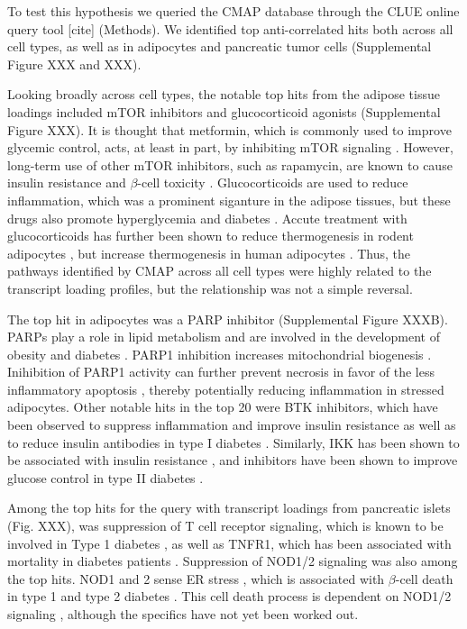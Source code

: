 \documentclass[
]{article}
\begin{document}
To test this hypothesis we queried the CMAP database through the CLUE
online query tool {[}cite{]} (Methods). We identified top
anti-correlated hits both across all cell types, as well as in
adipocytes and pancreatic tumor cells (Supplemental Figure XXX and XXX).

Looking broadly across cell types, the notable top hits from the adipose
tissue loadings included mTOR inhibitors and glucocorticoid agonists
(Supplemental Figure XXX). It is thought that metformin, which is
commonly used to improve glycemic control, acts, at least in part, by
inhibiting mTOR signaling \cite{pmid30290005, 
pmid30034573}. However, long-term use of other mTOR inhibitors, such as
rapamycin, are known to cause insulin resistance and \(\beta\)-cell
toxicity \cite{pmid30034573, pmid23881200, pmid21266327}.
Glucocorticoids are used to reduce inflammation, which was a prominent
siganture in the adipose tissues, but these drugs also promote
hyperglycemia and diabetes \cite{pmid24582093, pmid35585199}. Accute
treatment with glucocorticoids has further been shown to reduce
thermogenesis in rodent adipocytes \cite{pmid30310815, pmid11254472, 
pmid23197361}, but increase thermogenesis in human adipocytes
\cite{pmid27411014, pmid25385872}. Thus, the pathways identified by CMAP
across all cell types were highly related to the transcript loading
profiles, but the relationship was not a simple reversal.

The top hit in adipocytes was a PARP inhibitor (Supplemental Figure
XXXB). PARPs play a role in lipid metabolism and are involved in the
development of obesity and diabetes \cite{pmid34450194}. PARP1
inhibition increases mitochondrial biogenesis \cite{pmid21459330}.
Inihibition of PARP1 activity can further prevent necrosis in favor of
the less inflammatory apoptosis \cite{pmid12114611}, thereby potentially
reducing inflammation in stressed adipocytes. Other notable hits in the
top 20 were BTK inhibitors, which have been observed to suppress
inflammation and improve insulin resistance \cite{pmid33648925} as well
as to reduce insulin antibodies in type I diabetes \cite{pmid28753229}.
Similarly, IKK has been shown to be associated with insulin resistance
\cite{pmid15685170}, and inhibitors have been shown to improve glucose
control in type II diabetes \cite{pmid28683283}.

Among the top hits for the query with transcript loadings from
pancreatic islets (Fig. XXX), was suppression of T cell receptor
signaling, which is known to be involved in Type 1 diabetes
\cite{pmid33603744}, as well as TNFR1, which has been associated with
mortality in diabetes patients \cite{pmid32281000}. Suppression of
NOD1/2 signaling was also among the top hits. NOD1 and 2 sense ER stress
\cite{pmid27007849, pmid28823510}, which is associated with
\(\beta\)-cell death in type 1 and type 2 diabetes \cite{pmid24520198}.
This cell death process is dependent on NOD1/2 signaling
\cite{pmid27007849}, although the specifics have not yet been worked
out.
\end{document}
